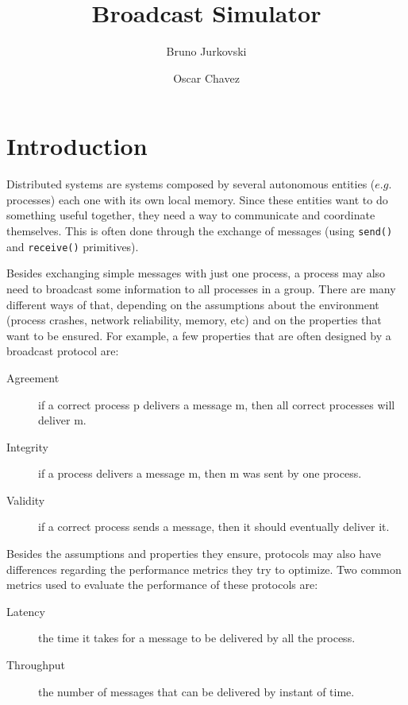 \documentclass[a4paper, 11pt]{article}
\begin{document}
\title{Broadcast Simulator}
\author{Bruno Jurkovski \and Oscar Chavez}
\maketitle
 
\tableofcontents

\newpage 
\section{Introduction}

	Distributed systems are systems composed by several autonomous entities ($e.g.$ processes) each one with its own local memory. Since these entities want to do something useful together, they need a way to communicate and coordinate themselves. This is often done through the exchange of messages (using \texttt{send()} and \texttt{receive()} primitives).
	
	Besides exchanging simple messages with just one process, a process may also need to broadcast some information to all processes in a group. There are many different ways of that, depending on the assumptions about the environment (process crashes, network reliability, memory, etc) and on the properties that want to be ensured. For example, a few properties that are often designed by a broadcast protocol are:

\begin{description}
	\item[Agreement] if a correct process p delivers a message m, then all correct processes will deliver m.
	\item[Integrity] if a process delivers a message m, then m was sent by one process.
	\item[Validity] if a correct process sends a message, then it should eventually deliver it.
\end{description}

	Besides the assumptions and properties they ensure, protocols may also have differences regarding the performance metrics they try to optimize. Two common metrics used to evaluate the performance of these protocols are:

\begin{description}
	\item[Latency] the time it takes for a message to be delivered by all the process.
	\item[Throughput] the number of messages that can be delivered by instant of time.
\end{description}
\end{document}
